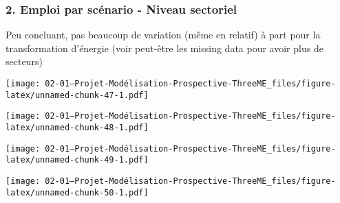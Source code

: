\documentclass[
]{article}
\begin{document}
\hypertarget{emploi-par-scuxe9nario---niveau-sectoriel}{%
\subsubsection{2. Emploi par scénario - Niveau
sectoriel}\label{emploi-par-scuxe9nario---niveau-sectoriel}}

Peu concluant, pas beaucoup de variation (même en relatif) à part pour
la transformation d'énergie (voir peut-être les missing data pour avoir
plus de secteurs)

\texttt{[image: 02-01---Projet-Modélisation-Prospective-ThreeME\_files/figure-latex/unnamed-chunk-47-1.pdf]}

\texttt{[image: 02-01---Projet-Modélisation-Prospective-ThreeME\_files/figure-latex/unnamed-chunk-48-1.pdf]}

\texttt{[image: 02-01---Projet-Modélisation-Prospective-ThreeME\_files/figure-latex/unnamed-chunk-49-1.pdf]}

\texttt{[image: 02-01---Projet-Modélisation-Prospective-ThreeME\_files/figure-latex/unnamed-chunk-50-1.pdf]}
\end{document}
